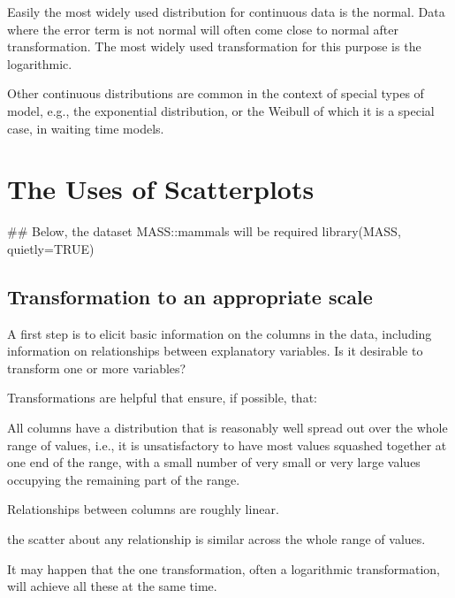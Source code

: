 Easily the most widely used distribution for continuous data is
the normal.  Data
where the error term is not normal will often come close to
normal after transformation.  The most widely used transformation
for this purpose is the logarithmic.

Other continuous distributions are common in the context of
special types of model, e.g., the exponential distribution, or
the Weibull of which it is a special case, in waiting time models.



\section{The Uses of Scatterplots}

\begin{Schunk}
\begin{Sinput}
## Below, the dataset MASS::mammals will be required
library(MASS, quietly=TRUE)
\end{Sinput}
\end{Schunk}

\subsection{Transformation to an appropriate scale}

A first step is to elicit basic information on the columns in the
data, including information on relationships between explanatory
variables.  Is it desirable to transform one or more variables?

Transformations are helpful that ensure, if possible, that:
\begin{itemizz}
\item All columns have a distribution that is reasonably well spread
  out over the whole range of values, i.e., it is unsatisfactory to
  have most values squashed together at one end of the range, with a
  small number of very small or very large values occupying the
  remaining part of the range.
  \item Relationships between columns are roughly linear.
  \item the scatter about any relationship is similar across the whole
range of values.
\end{itemizz}
It may happen that the one transformation, often a logarithmic
transformation, will achieve all these at the same time.

